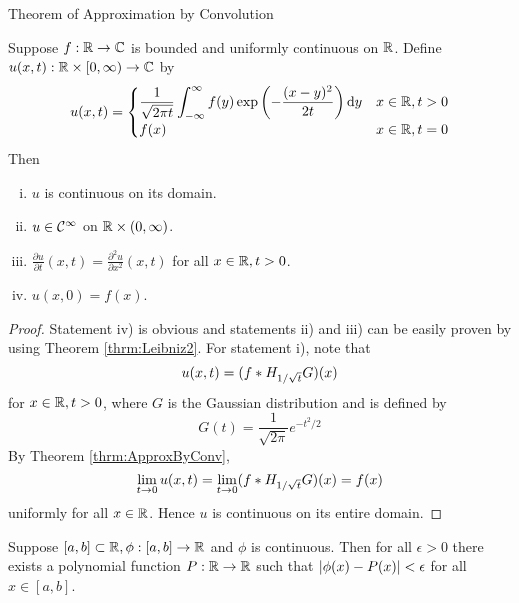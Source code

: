 \begin{section}{Theorem of Approximation by Convolution}
\begin{thrm}
	Suppose $f:\mathbb{R} \rightarrow \mathbb{C}$ is bounded and uniformly
	continuous on $\mathbb{R}$. Define $u(x,t):\mathbb{R} \times [0,\infty)
	\rightarrow \mathbb{C}$ by
		\begin{displaymath}
			u(x,t) = 
				\begin{cases}
					\displaystyle{\frac{1}{\sqrt{2\pi t}}
						\int_{-\infty}^{\infty}{f(y)\exp\left(-\frac{(x-y)^2}{2t}\right)}\, \mathrm{d}{y}}
						& {x} \in \mathbb{R}, t>0 \\
					f(x) & {x} \in \mathbb{R}, t=0
				\end{cases}
		\end{displaymath}
	Then
		\begin{enumerate}[i)]
			\item
				$u$ is continuous on its domain.
			\item
				$u \in \mathcal{C}^{\infty}$ on $\mathbb{R} \times (0,\infty)$.
			\item
				$\displaystyle{\frac{\partial u}{\partial t}(x,t) =
				\frac{\partial^2 u}{\partial x^2}(x,t)}$ for all ${x} \in \mathbb{R},
				t>0$.
			\item
				$u(x,0)=f(x)$.
		\end{enumerate}
\end{thrm}

\begin{proof}
	Statement iv) is obvious and statements ii) and iii) can be easily
	proven by using Theorem \ref{thrm:Leibniz2}. For statement i), note
	that
		\begin{displaymath}
			u(x,t) = ({f} \ast {H_{1/\sqrt{t}}G})(x)
		\end{displaymath}
	for ${x} \in \mathbb{R}, t>0$, where $G$ is the Gaussian distribution and is
	defined by
		\begin{displaymath}
			G(t) = \frac{1}{\sqrt{2\pi}}e^{-t^2/2}
		\end{displaymath}
	By Theorem \ref{thrm:ApproxByConv},
		\begin{displaymath}
			\lim_{t \rightarrow 0}u(x,t)
				= \lim_{t \rightarrow 0}({f} \ast {H_{1/\sqrt{t}}G})(x)
				= f(x)
		\end{displaymath}
	uniformly for all ${x} \in \mathbb{R}$. Hence $u$ is continuous on its entire
	domain.
\end{proof}


\begin{thrm}
	Suppose $[a,b] \subset \mathbb{R}, \phi:[a,b] \rightarrow \mathbb{R}$ and
	$\phi$ is continuous. Then for all $\epsilon>0$ there exists a
	polynomial function $P:\mathbb{R} \rightarrow \mathbb{R}$ such that
	$\left \vert {\phi(x)-P(x)} \right \vert<\epsilon$ for all $x \in [a,b]$.
\end{thrm}


\end{section}
